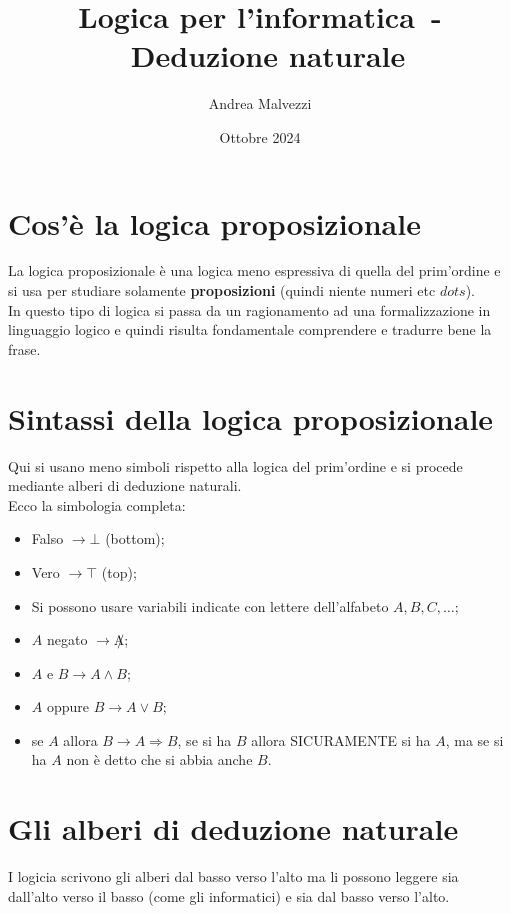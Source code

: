 \documentclass[12pt]{article}
\author{Andrea Malvezzi}
\title{\textbf{Logica per l'informatica~-~Deduzione naturale}}
\date{Ottobre 2024}
\begin{document}
\maketitle

\pagebreak
\tableofcontents

\pagebreak
\section{Cos'è la logica proposizionale}
\label{sec:whats_propos_logic}
La logica proposizionale è una logica meno espressiva di quella del prim'ordine e si usa per studiare solamente \textbf{proposizioni} (quindi niente numeri etc $dots$).\\
In questo tipo di logica si passa da un ragionamento ad una formalizzazione in linguaggio logico e quindi risulta fondamentale comprendere e tradurre bene la frase.

\section{Sintassi della logica proposizionale}
\label{sec:propos_logic_syntax}
Qui si usano meno simboli rispetto alla logica del prim'ordine e si procede mediante alberi di deduzione naturali.\\
Ecco la simbologia completa:
\begin{itemize}
    \item Falso $\rightarrow \bot$ (bottom);
    \item Vero $\rightarrow \top$ (top);
    \item Si possono usare variabili indicate con lettere dell'alfabeto $A, B, C, \dots$;
    \item $A$ negato $\rightarrow \not A$;
    \item $A$ e $B \rightarrow A \wedge B$;
    \item $A$ oppure $B \rightarrow A \vee B$;
    \item se $A$ allora $B \rightarrow A \Rightarrow B$, se si ha $B$ allora SICURAMENTE si ha $A$, ma se si ha $A$ non è detto che si abbia anche $B$.
\end{itemize}

\pagebreak

\section{Gli alberi di deduzione naturale}
\label{sec:trees}
I logicia scrivono gli alberi dal basso verso l'alto ma li possono leggere sia dall'alto verso il basso (come gli informatici) e sia dal basso verso l'alto.
\end{document}
